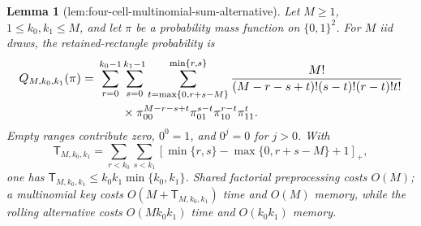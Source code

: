 \documentclass{article}
\newtheorem{lemma}{Lemma}
\begin{document}
\begin{lemma}[lem:four-cell-multinomial-sum-alternative]\label{lem:four-cell-multinomial-sum-alternative}
Let \(M\ge1\), \(1\le k_0,k_1\le M\), and let \(\pi\) be a probability mass function on \(\{0,1\}^2\). For \(M\) iid draws, the retained-rectangle probability is
\[
\makebox[\linewidth][c]{\resizebox{0.98\linewidth}{!}{\(\displaystyle \begin{aligned}
Q_{M,k_0,k_1}(\pi)
={}&\sum_{r=0}^{k_0-1}\sum_{s=0}^{k_1-1}
\sum_{t=\max\{0,r+s-M\}}^{\min\{r,s\}}
\frac{M!}{(M-r-s+t)!(s-t)!(r-t)!t!}\\
&\qquad{}\times
\pi_{00}^{M-r-s+t}\pi_{01}^{s-t}\pi_{10}^{r-t}\pi_{11}^{t}.
\end{aligned}\)}}
\]
Empty ranges contribute zero, \(0^0=1\), and \(0^j=0\) for \(j>0\). With
\[
\mathsf T_{M,k_0,k_1}
=\sum_{r<k_0}\sum_{s<k_1}
\left[\min\{r,s\}-\max\{0,r+s-M\}+1\right]_+,
\]
one has \(\mathsf T_{M,k_0,k_1}\le k_0k_1\min\{k_0,k_1\}\). Shared factorial preprocessing costs \(O(M)\); a multinomial key costs \(O(M+\mathsf T_{M,k_0,k_1})\) time and \(O(M)\) memory, while the rolling alternative costs \(O(Mk_0k_1)\) time and \(O(k_0k_1)\) memory.


\end{lemma}
\end{document}
